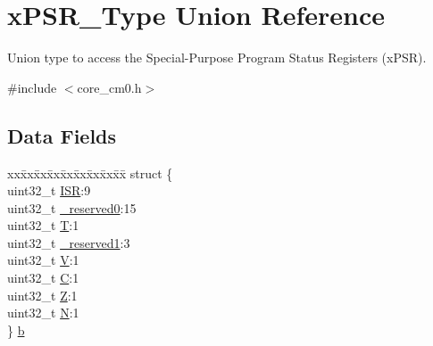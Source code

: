 \hypertarget{unionx_p_s_r___type}{}\section{x\+P\+S\+R\+\_\+\+Type Union Reference}
\label{unionx_p_s_r___type}


Union type to access the Special-\/\+Purpose Program Status Registers (x\+P\+SR).  




{\ttfamily \#include $<$core\+\_\+cm0.\+h$>$}

\subsection*{Data Fields}
\begin{DoxyCompactItemize}
\item 
\begin{tabbing}
xx\=xx\=xx\=xx\=xx\=xx\=xx\=xx\=xx\=\kill
struct \{\\
\>uint32\_t \mbox{\hyperlink{unionx_p_s_r___type_ad502ba7dbb2aab5f87c782b28f02622d}{ISR}}:9\\
\>uint32\_t \mbox{\hyperlink{unionx_p_s_r___type_ac8a6a13838a897c8d0b8bc991bbaf7c1}{\_reserved0}}:15\\
\>uint32\_t \mbox{\hyperlink{unionx_p_s_r___type_a6e1cf12e53a20224f6f62c001d9be972}{T}}:1\\
\>uint32\_t \mbox{\hyperlink{unionx_p_s_r___type_a959a73d8faee56599b7e792a7c5a2d16}{\_reserved1}}:3\\
\>uint32\_t \mbox{\hyperlink{unionx_p_s_r___type_acd4a2b64faee91e4a9eef300667fa222}{V}}:1\\
\>uint32\_t \mbox{\hyperlink{unionx_p_s_r___type_a7a1caf92f32fe9ebd8d1fe89b06c7776}{C}}:1\\
\>uint32\_t \mbox{\hyperlink{unionx_p_s_r___type_a5ae954cbd9986cd64625d7fa00943c8e}{Z}}:1\\
\>uint32\_t \mbox{\hyperlink{unionx_p_s_r___type_abae0610bc2a97bbf7f689e953e0b451f}{N}}:1\\
\} \mbox{\hyperlink{unionx_p_s_r___type_a8d8c45d946ef8df11f4cac72c667e98b}{b}}\\


\end{tabbing}
\end{DoxyCompactItemize}
